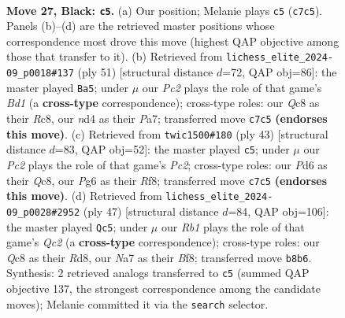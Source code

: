 \documentclass[11pt]{article}
\begin{document}
\clearpage

\begin{figure}[p]\centering
\begin{subfigure}{0.46\textwidth}\centering
\resizebox{\linewidth}{!}{%
\newchessgame
\chessboard[
  setfen={1rq2b2/n1p1rk2/p2p1pp1/3P3p/RP1NP3/5R1P/3B1PP1/1Q4K1 b - - 4 27},
  showmover=false,
  pgfstyle=straightmove, color=movearrow, markmove={c7-c5}
]}
\caption{}
\end{subfigure}\hfill
\begin{subfigure}{0.46\textwidth}\centering
\resizebox{\linewidth}{!}{%
\newchessgame
\chessboard[
  setfen={1rrb2k1/p4ppp/q3p3/2p1N3/3pP3/PP1P3P/2Q2PP1/1R2R1K1 b - - 0 26},
  showmover=false,
  pgfstyle=straightmove, color=movearrow, markmove={d8-a5}
]}
\caption{}
\end{subfigure}
\\[4pt]
\begin{subfigure}{0.46\textwidth}\centering
\resizebox{\linewidth}{!}{%
\newchessgame
\chessboard[
  setfen={r1q2r2/1pp3k1/1p1p2np/3P1p2/1P2pP2/P1P4P/2Q1N1PK/R4R2 b - - 0 22},
  showmover=false,
  pgfstyle=straightmove, color=movearrow, markmove={c7-c5}
]}
\caption{}
\end{subfigure}\hfill
\begin{subfigure}{0.46\textwidth}\centering
\resizebox{\linewidth}{!}{%
\newchessgame
\chessboard[
  setfen={3r1bk1/1pq2r1p/1p4p1/pB1p4/P4P2/1QP1P2R/1P3P2/2KR4 b - - 0 24},
  showmover=false,
  pgfstyle=straightmove, color=movearrow, markmove={c7-c5}
]}
\caption{}
\end{subfigure}
\caption{\textbf{Move 27, Black: \texttt{c5}.} (a) Our position; Melanie plays \texttt{c5} (\texttt{c7c5}). Panels (b)--(d) are the retrieved master positions whose correspondence most drove this move (highest QAP objective among those that transfer to it). (b) Retrieved from \texttt{lichess\_elite\_2024-09\_p0018\#137} (ply 51) [structural distance $d$=72, QAP obj=86]: the master played \texttt{Ba5}; under $\mu$ our \emph{Pc2} plays the role of that game's \emph{Bd1} (a \textbf{cross-type} correspondence); cross-type roles: our \emph{Q}c8 as their \emph{R}c8, our \emph{n}d4 as their \emph{P}a7; transferred move \texttt{c7c5} \textbf{(endorses this move)}. (c) Retrieved from \texttt{twic1500\#180} (ply 43) [structural distance $d$=83, QAP obj=52]: the master played \texttt{c5}; under $\mu$ our \emph{Pc2} plays the role of that game's \emph{Pc2}; cross-type roles: our \emph{P}d6 as their \emph{Q}c8, our \emph{P}g6 as their \emph{R}f8; transferred move \texttt{c7c5} \textbf{(endorses this move)}. (d) Retrieved from \texttt{lichess\_elite\_2024-09\_p0028\#2952} (ply 47) [structural distance $d$=84, QAP obj=106]: the master played \texttt{Qc5}; under $\mu$ our \emph{Rb1} plays the role of that game's \emph{Qc2} (a \textbf{cross-type} correspondence); cross-type roles: our \emph{Q}c8 as their \emph{R}d8, our \emph{N}a7 as their \emph{B}f8; transferred move \texttt{b8b6}. Synthesis: 2 retrieved analogs transferred to \texttt{c5} (summed QAP objective 137, the strongest correspondence among the candidate moves); Melanie committed it via the \texttt{search} selector.}
\label{fig:thought-m53}
\end{figure}
\end{document}
